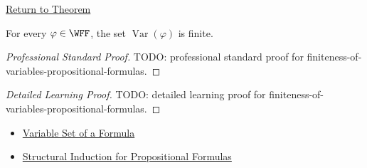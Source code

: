 \newpage
{}
\label{prf:finiteness-of-variables-propositional-formulas}

\begin{remark*}[Return]
\hyperref[lem:finiteness-of-variables-propositional-formulas]{Return to Theorem}
\end{remark*}

\begin{lemma*}
For every \(\varphi\in\WFF\), the set \(\operatorname{Var}(\varphi)\) is finite.
\end{lemma*}

\begin{proof}[Professional Standard Proof]
\LRAProofBodyStart
TODO: professional standard proof for finiteness-of-variables-propositional-formulas.
\end{proof}

\begin{proof}[Detailed Learning Proof]
\LRAProofBodyStart
TODO: detailed learning proof for finiteness-of-variables-propositional-formulas.
\end{proof}

\begin{remark*}
\end{remark*}

\begin{dependencies}
\begin{itemize}
  \item \hyperref[def:formula-variable-set-propositional-logic]{Variable Set of a Formula}
  \item \hyperref[thm:structural-induction-propositional-formulas]{Structural Induction for Propositional Formulas}
\end{itemize}
\end{dependencies}

\clearpage
